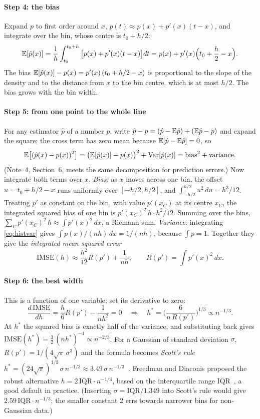 \documentclass[11pt]{article}
\begin{document}
\paragraph{Step 4: the bias} Expand $p$ to first order around $x$, $p(t) \approx p(x) + p'(x)(t - x)$, and integrate
over the bin, whose centre is $t_0 + h/2$:
\[
  \mathbb{E}[\hat p(x)] = \frac{1}{h} \int_{t_0}^{t_0 + h} \big[p(x) + p'(x)(t - x)\big] dt
  = p(x) + p'(x) \Big(t_0 + \frac{h}{2} - x\Big) .
\]
The bias $\mathbb{E}[\hat p(x)] - p(x) = p'(x)\,(t_0 + h/2 - x)$ is proportional to the slope of the density and to the
distance from $x$ to the bin centre, which is at most $h/2$. The bias grows with the bin width.

\paragraph{Step 5: from one point to the whole line} For any estimator $\hat p$ of a number $p$, write
$\hat p - p = (\hat p - \mathbb{E}\hat p) + (\mathbb{E}\hat p - p)$ and expand the square; the cross term has zero mean because
$\mathbb{E}[\hat p - \mathbb{E}\hat p] = 0$, so
\[
  \mathbb{E}\big[(\hat p(x) - p(x))^2\big] = \big(\mathbb{E}[\hat p(x)] - p(x)\big)^2 + \operatorname{Var}[\hat p(x)]
  = \text{bias}^2 + \text{variance} .
\]
(Note~4, Section~6, meets the same decomposition for prediction errors.) Now integrate both terms over $x$.
\emph{Bias:} as $x$ moves across one bin, the offset $u = t_0 + h/2 - x$ runs uniformly over $[-h/2, h/2]$, and
$\int_{-h/2}^{h/2} u^2\, du = h^3/12$. Treating $p'$ as constant on the bin, with value $p'(x_C)$ at its centre $x_C$,
the integrated squared bias of one bin is $p'(x_C)^2\, h \cdot h^2/12$. Summing over the bins,
$\sum_C p'(x_C)^2\, h \approx \int p'(x)^2\, dx$, a Riemann sum. \emph{Variance:} integrating \eqref{eq:histvar} gives
$\int p(x)/(nh)\, dx = 1/(nh)$, because $\int p = 1$. Together they give the \emph{integrated mean squared error}
\begin{equation}\label{eq:imse}
  \mathrm{IMSE}(h) \approx \frac{h^2}{12} R(p') + \frac{1}{nh}, \qquad R(p') = \int p'(x)^2\, dx .
\end{equation}

\paragraph{Step 6: the best width} This is a function of one variable; set its derivative to zero:
\[
  \frac{d\,\mathrm{IMSE}}{dh} = \frac{h}{6} R(p') - \frac{1}{n h^2} = 0
  \quad\Longrightarrow\quad
  h^* = \Big(\frac{6}{n\, R(p')}\Big)^{1/3} \propto n^{-1/3} .
\]
At $h^*$ the squared bias is exactly half of the variance, and substituting back gives
$\mathrm{IMSE}(h^*) = \tfrac{3}{2}\,(nh^*)^{-1} \propto n^{-2/3}$. For a Gaussian of standard deviation $\sigma$,
$R(p') = 1/(4\sqrt{\pi}\,\sigma^3)$ and the formula becomes \emph{Scott's rule}
$h^* = (24\sqrt\pi)^{1/3}\, \sigma\, n^{-1/3} \approx 3.49\, \sigma\, n^{-1/3}$~\cite{scott1979}. Freedman and
Diaconis proposed the robust alternative $h = 2\,\mathrm{IQR}\cdot n^{-1/3}$, based on the interquartile range
IQR~\cite{freedman1981}, a good default in practice. (Inserting $\sigma = \mathrm{IQR}/1.349$ into Scott's rule would
give $2.59\,\mathrm{IQR}\cdot n^{-1/3}$; the smaller constant 2 errs towards narrower bins for non-Gaussian data.)
\end{document}
